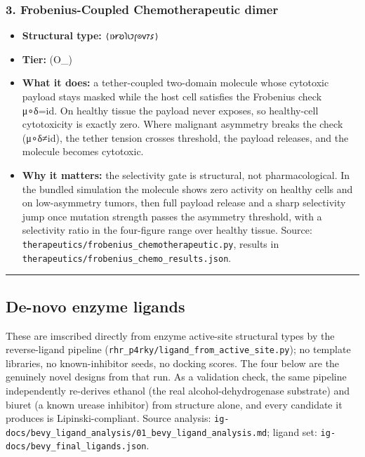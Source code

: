 \documentclass[12pt,a4paper]{article}
\begin{document}
\hypertarget{frobenius-coupled-chemotherapeutic-dimer}{%
\subsubsection{3. Frobenius-Coupled Chemotherapeutic
dimer}\label{frobenius-coupled-chemotherapeutic-dimer}}

\begin{itemize}
\tightlist
\item
  \textbf{Structural type:} \texttt{⟨𐑦𐑶𐑾𐑹𐑐𐑧𐑲𐑝⊙𐑫𐑳𐑭⟩}
\item
  \textbf{Tier:} (O\_\infty)
\item
  \textbf{What it does:} a tether-coupled two-domain molecule whose
  cytotoxic payload stays masked while the host cell satisfies the
  Frobenius check μ∘δ=id. On healthy tissue the payload never exposes,
  so healthy-cell cytotoxicity is exactly zero. Where malignant
  asymmetry breaks the check (μ∘δ≠id), the tether tension crosses
  threshold, the payload releases, and the molecule becomes cytotoxic.
\item
  \textbf{Why it matters:} the selectivity gate is structural, not
  pharmacological. In the bundled simulation the molecule shows zero
  activity on healthy cells and on low-asymmetry tumors, then full
  payload release and a sharp selectivity jump once mutation strength
  passes the asymmetry threshold, with a selectivity ratio in the
  four-figure range over healthy tissue. Source:
  \texttt{therapeutics/frobenius\_chemotherapeutic.py}, results in
  \texttt{therapeutics/frobenius\_chemo\_results.json}.
\end{itemize}

\begin{center}\rule{0.5\linewidth}{0.5pt}\end{center}

\hypertarget{de-novo-enzyme-ligands}{%
\subsection{De-novo enzyme ligands}\label{de-novo-enzyme-ligands}}

These are imscribed directly from enzyme active-site structural types by
the reverse-ligand pipeline
(\texttt{rhr\_p4rky/ligand\_from\_active\_site.py}); no template
libraries, no known-inhibitor seeds, no docking scores. The four below
are the genuinely novel designs from that run. As a validation check,
the same pipeline independently re-derives ethanol (the real
alcohol-dehydrogenase substrate) and biuret (a known urease inhibitor)
from structure alone, and every candidate it produces is
Lipinski-compliant. Source analysis:
\texttt{ig-docs/bevy\_ligand\_analysis/01\_bevy\_ligand\_analysis.md};
ligand set: \texttt{ig-docs/bevy\_final\_ligands.json}.
\end{document}
